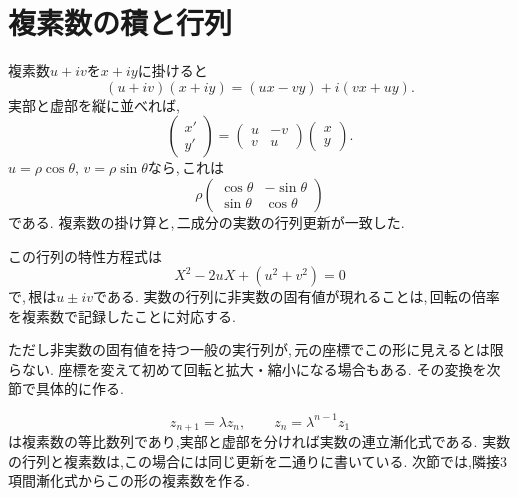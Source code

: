 \section{複素数の積と行列}\label{節：複素数の積と行列}

複素数$u+iv$を$x+iy$に掛けると
\[
 (u+iv)(x+iy)=(ux-vy)+i(vx+uy).
\]
実部と虚部を縦に並べれば,
\[
 \begin{pmatrix}x'\\y'\end{pmatrix}
 =
 \begin{pmatrix}u&-v\\v&u\end{pmatrix}
 \begin{pmatrix}x\\y\end{pmatrix}.
\]
$u=\rho\cos\theta,\,v=\rho\sin\theta$なら,\,これは
\[
 \rho
 \begin{pmatrix}
 \cos\theta&-\sin\theta\\
 \sin\theta&\cos\theta
 \end{pmatrix}
\]
である. 複素数の掛け算と,\,二成分の実数の行列更新が一致した.

この行列の特性方程式は
\[
 X^2-2uX+(u^2+v^2)=0
\]
で,\,根は$u\pm iv$である.
実数の行列に非実数の固有値が現れることは,\,回転の倍率を複素数で記録したことに対応する.

ただし非実数の固有値を持つ一般の実行列が,\,元の座標でこの形に見えるとは限らない.
座標を変えて初めて回転と拡大・縮小になる場合もある.
その変換を次節で具体的に作る.


\[
 z_{n+1}=\lambda z_n,\qquad z_n=\lambda^{n-1}z_1
\]
は複素数の等比数列であり,実部と虚部を分ければ実数の連立漸化式である.
実数の行列と複素数は,この場合には同じ更新を二通りに書いている.
次節では,隣接3項間漸化式からこの形の複素数を作る.
